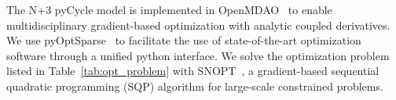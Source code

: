 \documentclass[conf]{new-aiaa}
\begin{document}
The N+3 pyCycle model is implemented in OpenMDAO~\cite{Gray2019a} to enable multidisciplinary gradient-based optimization with analytic coupled derivatives.
We use pyOptSparse~\cite{Wu2020a} to facilitate the use of state-of-the-art optimization software through a unified python interface.
We solve the optimization problem listed in Table~\ref{tab:opt_problem} with SNOPT~\cite{Gill2005a}, a gradient-based sequential quadratic programming (SQP) algorithm for large-scale constrained problems.


\end{document}
